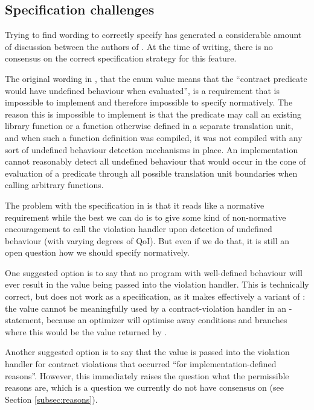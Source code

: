 \subsection{Specification challenges}

Trying to find wording to correctly specify \mbox{} has generated a considerable amount of discussion between the authors of \cite{P2900R4}. At the time of writing, there is no consensus on the correct specification strategy for this feature.

The original wording in \cite{P2811R5}, that the enum value means that the “contract predicate would have undefined behaviour when evaluated”, is a requirement that is impossible to implement and therefore impossible to specify normatively. The reason this is impossible to implement is that the predicate may call an existing library function or a function otherwise defined in a separate translation unit, and when such a function definition was compiled, it was not compiled with any sort of undefined behaviour detection mechanisms in place. An implementation cannot reasonably detect all undefined behaviour that would occur in the cone of evaluation of a predicate through all possible translation unit boundaries when calling arbitrary functions.

The problem with the specification in \cite{P2811R5} is that it reads like a normative requirement while the best we can do is to give some kind of non-normative encouragement to call the violation handler upon detection of undefined behaviour (with varying degrees of QoI). But even if we do that, it is still an open question how we should specify \mbox{} normatively.

One suggested option is to say that no program with well-defined behaviour will ever result in the value \mbox{} being passed into the violation handler. This is technically correct, but does not work as a specification, as it makes  \mbox{} effectively a variant of : the value cannot be meaningfully used by a contract-violation handler in an -statement, because an optimizer will optimise away conditions and branches where this would be the value returned by .

Another suggested option is to say that the value \mbox{} is passed into the violation handler for contract violations that occurred ``for implementation-defined reasons''. However, this immediately raises the question what the permissible reasons are, which is a question we currently do not have consensus on (see Section \ref{subsec:reasons}).

